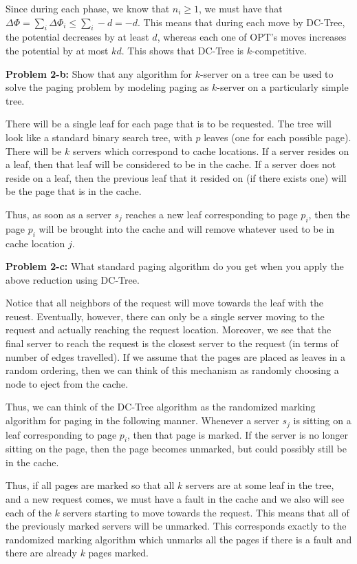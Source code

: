 \documentclass[psamsfonts]{amsart}
\newenvironment{sol}{\vspace{0.25cm}{\large \bfseries Solution:}}{\qedsymbol}
\newenvironment{prob}[1]{\begin{framed}{\large \bfseries Problem #1:}}{\end{framed}}
\begin{document}
\begin{sol}
Since during each phase, we know that $n_i \geq 1$, we must have that $\Delta \Phi =  \sum_{i} \Delta \Phi_i \leq \sum_{i} -d = -d$. This means that during each move by DC-Tree, the potential decreases by at least $d$, whereas each one of OPT's moves increases the potential by at most $kd$. This shows that DC-Tree is $k$-competitive.
\end{sol}

\begin{prob}{2-b}
Show that any algorithm for $k$-server on a tree can be used to solve the paging problem by modeling paging as $k$-server on a particularly simple tree. 
\end{prob}
\begin{sol}
There will be a single leaf for each page that is to be requested. The tree will look like a standard binary search tree, with $p$ leaves (one for each possible page). There will be $k$ servers which correspond to cache locations. If a server resides on a leaf, then that leaf will be considered to be in the cache. If a server does not reside on a leaf, then the previous leaf that it resided on (if there exists one) will be the page that is in the cache. 

Thus, as soon as a server $s_j$ reaches a new leaf corresponding to page $p_i$, then the page $p_i$ will be brought into the cache and will remove whatever used to be in cache location $j$. 
\end{sol}

\begin{prob}{2-c}
What standard paging algorithm do you get when you apply the above reduction using DC-Tree.
\end{prob}
\begin{sol}
Notice that all neighbors of the request will move towards the leaf with the reuest. Eventually, however, there can only be a single server moving to the request and actually reaching the request location. Moreover, we see that the final server to reach the request is the closest server to the request (in terms of number of edges travelled). If we assume that the pages are placed as leaves in a random ordering, then we can think of this mechanism as randomly choosing a node to eject from the cache.

Thus, we can think of the DC-Tree algorithm as the randomized marking algorithm for paging in the following manner. Whenever a server $s_j$ is sitting on a leaf corresponding to page $p_i$, then that page is marked. If the server is no longer sitting on the page, then the page becomes unmarked, but could possibly still be in the cache. 

Thus, if all pages are marked so that all $k$ servers are at some leaf in the tree, and a new request comes, we must have a fault in the cache and we also will see each of the $k$ servers starting to move towards the request. This means that all of the previously marked servers will be unmarked. This corresponds exactly to the randomized marking algorithm which unmarks all the pages if there is a fault and there are already $k$ pages marked. 
\end{sol}
\end{document}
